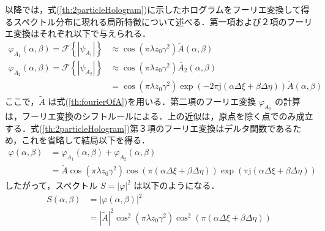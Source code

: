 以降では，式(\ref{th:2particleHologram})に示したホログラムをフーリエ変換して得るスペクトル分布に現れる局所特徴について述べる．第一項および２項のフーリエ変換はそれぞれ以下で与えられる\cite{doubleexposure}．
\begin{align}
    \label{th:particle1Fourier}
    \varphi_{A_1}(\alpha,\beta)  = \mathcal{F}\left\{\left| \psi_{A_1} \right|\right\}  &\approx \cos{ \left( \pi \lambda z_0 \gamma^2 \right) }\tilde{A}(\alpha,\beta)  \\
    \label{th:particle2Fourier}
    \varphi_{A_2}(\alpha,\beta) = \mathcal{F}\left\{\left| \psi_{A_2} \right|\right\}   &\approx \cos{ \left( \pi \lambda z_0 \gamma^2 \right) }\tilde{A_2}(\alpha,\beta) \\
    &=\cos{ \left( \pi \lambda z_0 \gamma^2 \right) } \exp{\left( -2\pi \mathrm{j}\left( \alpha \Delta \xi + \beta \Delta \eta \right) \right)} \tilde{A}(\alpha,\beta)
\end{align}
ここで，$\tilde{A}$ は式(\ref{th:fourierOfA})を用いる．第二項のフーリエ変換 $\varphi_{A_2}$ の計算は，フーリエ変換のシフトルールによる．上の近似は，原点を除く点でのみ成立する．式(\ref{th:2particleHologram})第３項のフーリエ変換はデルタ関数であるため，これを省略して結局以下を得る．
\begin{align}
    \varphi(\alpha,\beta) &= \varphi_{A_1}(\alpha,\beta) + \varphi_{A_2}(\alpha,\beta) \\
    &= \tilde{A} \cos{\left( \pi \lambda z_0 \gamma^2 \right)} \cos{\left( \pi \left( \alpha \Delta \xi + \beta \Delta \eta \right) \right)} \exp{\left( \pi \mathrm{j} \left( \alpha \Delta \xi + \beta \Delta \eta \right) \right)}
\end{align}
したがって，スペクトル $S = |\varphi|^2$ は以下のようになる．
\begin{align}
    S(\alpha,\beta) &= \left| \varphi(\alpha,\beta) \right|^2 \\
    \label{th:2particleSpectrum}
    &= \left| \tilde{A} \right|^2 \cos^2{\left( \pi \lambda z_0 \gamma^2 \right)} \cos^2{\left( \pi \left( \alpha \Delta \xi + \beta \Delta \eta \right) \right)}
\end{align}

